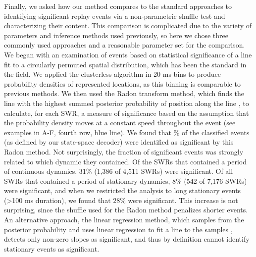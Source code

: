 \documentclass[9pt,lineno]{elife}
\begin{document}
Finally, we asked how our method compares to the standard approaches to identifying significant replay events via a non-parametric shuffle test and characterizing their content. This comparison is complicated due to the variety of parameters and inference methods used previously, so here we chose three commonly used approaches and a reasonable parameter set for the comparison. We began with an examination of events based on statistical significance of a line fit to a circularly permuted spatial distribution, which has been the standard in the field.  We applied the clusterless algorithm in 20 ms bins to produce probability densities of represented locations, as this binning is comparable to previous methods. We then used the Radon transform method, which finds the line with the highest summed posterior probability of position along the line \citep{DavidsonHippocampalReplayExtended2009, FarooqEmergencepreconfiguredplastic2019}, to calculate, for each SWR, a measure of significance based on the assumption that the probability density moves at a constant speed throughout the event (see examples in A-F, fourth row, blue line). We found that \% of the classified events (as defined by our state-space decoder) were identified as significant by this Radon method. Not surprisingly, the fraction of significant events was strongly related to which dynamic they contained. Of the SWRs that contained a period of continuous dynamics, 31\% (1,386 of 4,511 SWRs) were significant. Of all SWRs that contained a period of stationary dynamics, 8\% (542 of 7,176 SWRs) were significant, and when we restricted the analysis to long stationary events (>100 ms duration), we found that 28\% were significant. This increase is not surprising, since the shuffle used for the Radon method penalizes shorter events. An alternative approach, the linear regression method, which samples from the posterior probability and uses linear regression to fit a line to the samples \citep{KarlssonAwakereplayremote2009, CarrHippocampalreplayawake2011, ShinDynamicsAwakeHippocampalPrefrontal2019}, detects only non-zero slopes as significant, and thus by definition cannot identify stationary events as significant. 
\end{document}
